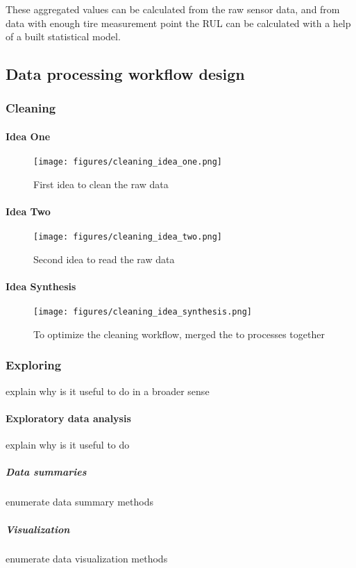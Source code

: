 These aggregated values can be calculated from the raw sensor data, and from data with enough tire measurement point the RUL can be calculated with a help of a built statistical model.

\subsection{Data processing workflow design}
\cite{CSDISTILLED}
\cite{DATACAMP}	
\cite{LeanThinking}
	\subsubsection{Cleaning}
		\paragraph{Idea One}
			\begin{figure}[!ht]
			\centering
			\texttt{[image: figures/cleaning\_idea\_one.png]}
			\caption{First idea to clean the raw data} 
			\end{figure}
		\paragraph{Idea Two}
			\begin{figure}[!ht]
			\centering
			\texttt{[image: figures/cleaning\_idea\_two.png]}
			\caption{Second idea to read the raw data} 
			\end{figure}
		\paragraph{Idea Synthesis}
			\begin{figure}[!ht]
			\centering
			\texttt{[image: figures/cleaning\_idea\_synthesis.png]}
			\caption{To optimize the cleaning workflow, merged the to processes together} 
			\end{figure}
	\subsubsection{Exploring}
	explain why is it useful to do in a broader sense
		\paragraph{Exploratory data analysis}
			explain why is it useful to do
			\subparagraph{Data summaries}
			enumerate data summary methods
			\subparagraph{Visualization}
			enumerate data visualization methods
